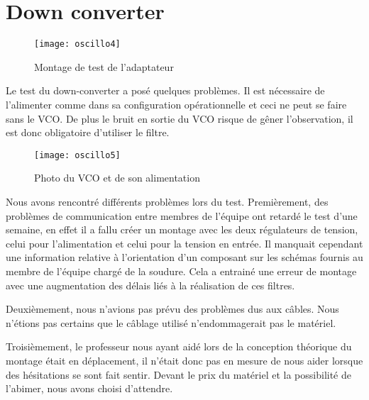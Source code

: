 \section{Down converter}
\label{sec:down_converter}



\begin{figure}[h]
  \centering
  \texttt{[image: oscillo4]}
  \caption{Montage de test de l’adaptateur}
  \label{fig:mont}
\end{figure}


Le test du down-converter a posé quelques problèmes. Il est nécessaire de l’alimenter comme dans sa configuration opérationnelle et ceci ne peut se faire sans le VCO. De plus le bruit en sortie du VCO risque de gêner l’observation, il est donc obligatoire d'utiliser le filtre.


\begin{figure}[h]
  \centering
  \texttt{[image: oscillo5]}
  \caption{Photo du VCO et de son alimentation}
  \label{fig:photo}
\end{figure}



Nous avons rencontré différents  problèmes lors du test. Premièrement, des problèmes de communication entre membres de l’équipe ont retardé le test d’une semaine, en effet il a fallu créer un montage avec les deux régulateurs de tension, celui pour l’alimentation et celui pour la tension en entrée. Il manquait cependant une information relative à l'orientation d'un composant sur les schémas fournis au membre de l'équipe chargé de la soudure. Cela a entrainé une erreur de montage avec une augmentation des délais liés à la réalisation de ces filtres.

Deuxièmement, nous n’avions pas prévu des problèmes dus aux câbles. Nous n'étions pas certains que le câblage utilisé n'endommagerait pas le matériel.

Troisièmement, le professeur nous ayant aidé lors de la conception théorique du montage était en déplacement, il n’était donc pas en mesure de nous aider lorsque des hésitations se sont fait sentir. Devant le prix du matériel et la possibilité de l'abimer, nous avons choisi d'attendre.


